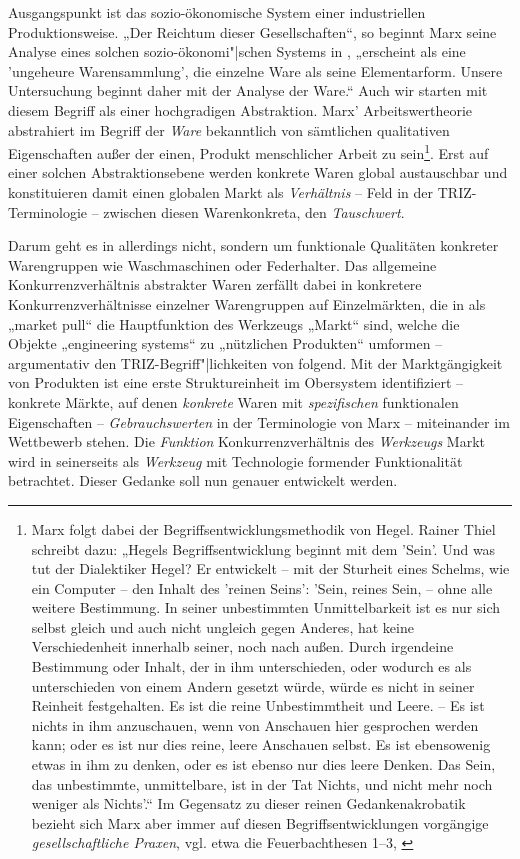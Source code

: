 \documentclass[11pt,a4paper]{article}
\begin{document}
Ausgangspunkt ist das sozio-ökonomische System einer industriellen
Produktionsweise. „Der Reichtum dieser Gesellschaften“, so beginnt Marx seine
Analyse eines solchen sozio-ökonomi"|schen Systems in \cite{MEW23}, „erscheint
als eine 'ungeheure Warensammlung', die einzelne Ware als seine
Elementarform. Unsere Untersuchung beginnt daher mit der Analyse der Ware.“
Auch wir starten mit diesem Begriff als einer hochgradigen Abstraktion.  Marx'
Arbeitswertheorie abstrahiert im Begriff der \emph{Ware} bekanntlich von
sämtlichen qualitativen Eigenschaften außer der einen, Produkt menschlicher
Arbeit zu sein\footnote{Marx folgt dabei der Begriffsentwicklungsmethodik von
  Hegel. Rainer Thiel \cite[S. 190]{Thiel2007} schreibt dazu: „Hegels
  Begriffsentwicklung beginnt mit dem 'Sein'. Und was tut der Dialektiker
  Hegel? Er entwickelt – mit der Sturheit eines Schelms, wie ein Computer –
  den Inhalt des 'reinen Seins': 'Sein, reines Sein, -- ohne alle weitere
  Bestimmung. In seiner unbestimmten Unmittelbarkeit ist es nur sich selbst
  gleich und auch nicht ungleich gegen Anderes, hat keine Verschiedenheit
  innerhalb seiner, noch nach außen. Durch irgendeine Bestimmung oder Inhalt,
  der in ihm unterschieden, oder wodurch es als unterschieden von einem Andern
  gesetzt würde, würde es nicht in seiner Reinheit festgehalten. Es ist die
  reine Unbestimmtheit und Leere. – Es ist nichts in ihm anzuschauen, wenn von
  Anschauen hier gesprochen werden kann; oder es ist nur dies reine, leere
  Anschauen selbst. Es ist ebensowenig etwas in ihm zu denken, oder es ist
  ebenso nur dies leere Denken. Das Sein, das unbestimmte, unmittelbare, ist
  in der Tat Nichts, und nicht mehr noch weniger als Nichts'.“ Im Gegensatz zu
  dieser reinen Gedankenakrobatik bezieht sich Marx aber immer auf diesen
  Begriffsentwicklungen vorgängige \emph{gesellschaftliche Praxen}, vgl. etwa
  die Feuerbachthesen 1--3, \cite{MEW3}}.  Erst auf einer solchen
Abstraktionsebene werden konkrete Waren global austauschbar und konstituieren
damit einen globalen Markt als \emph{Verhältnis} -- Feld in der
TRIZ-Terminologie -- zwischen diesen Warenkonkreta, den \emph{Tauschwert}.

Darum geht es in \cite{TESE2018} allerdings nicht, sondern um funktionale
Qualitäten konkreter Warengruppen wie Waschmaschinen oder Federhalter. Das
allgemeine Konkurrenzverhältnis abstrakter Waren zerfällt dabei in konkretere
Konkurrenzverhältnisse einzelner Warengruppen auf Einzelmärkten, die in
\cite{TESE2018} als „market pull“ die Hauptfunktion des Werkzeugs „Markt“
sind, welche die Objekte „engineering systems“ zu „nützlichen Produkten“
umformen -- argumentativ den TRIZ-Begriff"|lichkeiten von \cite{TT} folgend.
Mit der Marktgängigkeit von Produkten ist eine erste Struktureinheit im
Obersystem identifiziert -- konkrete Märkte, auf denen \emph{konkrete} Waren
mit \emph{spezifischen} funktionalen Eigenschaften -- \emph{Gebrauchswerten}
in der Terminologie von Marx -- miteinander im Wettbewerb stehen.  Die
\emph{Funktion} Konkurrenzverhältnis des \emph{Werkzeugs} Markt wird in
\cite{TESE2018} seinerseits als \emph{Werkzeug} mit Technologie formender
Funktionalität betrachtet.  Dieser Gedanke soll nun genauer entwickelt werden.
\end{document}

